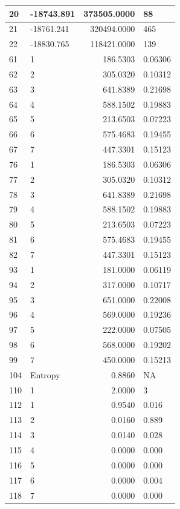 \documentclass[]{book}
\theoremstyle{definition}
\theoremstyle{definition}
\theoremstyle{definition}
\theoremstyle{remark}
\begin{document}
\begin{tabular}{l|l|r|l}
\hline
20 & -18743.891 & 373505.0000 & 88\\
\hline
21 & -18761.241 & 320494.0000 & 465\\
\hline
22 & -18830.765 & 118421.0000 & 139\\
\hline
61 & 1 & 186.5303 & 0.06306\\
\hline
62 & 2 & 305.0320 & 0.10312\\
\hline
63 & 3 & 641.8389 & 0.21698\\
\hline
64 & 4 & 588.1502 & 0.19883\\
\hline
65 & 5 & 213.6503 & 0.07223\\
\hline
66 & 6 & 575.4683 & 0.19455\\
\hline
67 & 7 & 447.3301 & 0.15123\\
\hline
76 & 1 & 186.5303 & 0.06306\\
\hline
77 & 2 & 305.0320 & 0.10312\\
\hline
78 & 3 & 641.8389 & 0.21698\\
\hline
79 & 4 & 588.1502 & 0.19883\\
\hline
80 & 5 & 213.6503 & 0.07223\\
\hline
81 & 6 & 575.4683 & 0.19455\\
\hline
82 & 7 & 447.3301 & 0.15123\\
\hline
93 & 1 & 181.0000 & 0.06119\\
\hline
94 & 2 & 317.0000 & 0.10717\\
\hline
95 & 3 & 651.0000 & 0.22008\\
\hline
96 & 4 & 569.0000 & 0.19236\\
\hline
97 & 5 & 222.0000 & 0.07505\\
\hline
98 & 6 & 568.0000 & 0.19202\\
\hline
99 & 7 & 450.0000 & 0.15213\\
\hline
104 & Entropy & 0.8860 & NA\\
\hline
110 & 1 & 2.0000 & 3\\
\hline
112 & 1 & 0.9540 & 0.016\\
\hline
113 & 2 & 0.0160 & 0.889\\
\hline
114 & 3 & 0.0140 & 0.028\\
\hline
115 & 4 & 0.0000 & 0.000\\
\hline
116 & 5 & 0.0000 & 0.000\\
\hline
117 & 6 & 0.0000 & 0.004\\
\hline
118 & 7 & 0.0000 & 0.000\\
\hline
\end{tabular}
\end{document}
